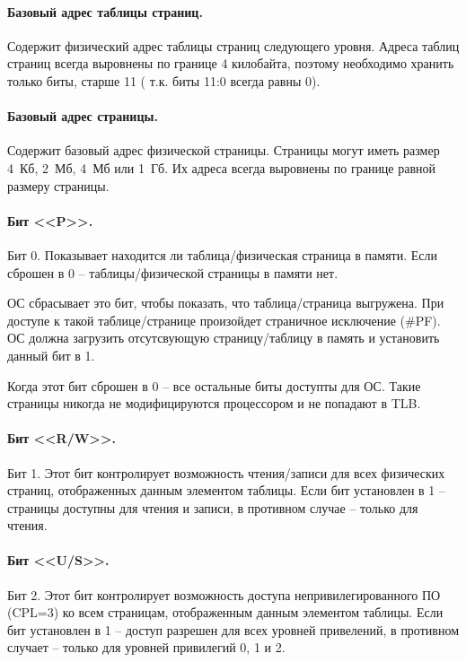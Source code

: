 \paragraph{Базовый адрес таблицы страниц.} Содержит физический адрес таблицы страниц следующего уровня.
Адреса таблиц страниц всегда выровнены по границе 4 килобайта, поэтому необходимо хранить только биты, старше 11 (
т.к. биты 11:0 всегда равны 0).

\paragraph{Базовый адрес страницы.} Содержит базовый адрес физической страницы. Страницы могут иметь размер 4~Кб, 2~Мб,
4~Мб или 1~Гб. Их адреса всегда выровнены по границе равной размеру страницы.

\paragraph{Бит <<P>>.} Бит 0. Показывает находится ли таблица/физическая страница в памяти. Если сброшен в 0 --
таблицы/физической страницы в памяти нет.

ОС сбрасывает это бит, чтобы показать, что таблица/страница выгружена. При доступе к такой таблице/странице произойдет страничное
исключение (\#PF). ОС должна загрузить отсутсвующую страницу/таблицу в память и установить данный бит в 1.

Когда этот бит сброшен в 0 -- все остальные биты доступты для ОС. Такие страницы никогда не модифицируются процессором и
не попадают в TLB.

\paragraph{Бит <<R/W>>.} Бит 1. Этот бит контролирует возможность чтения/записи для всех физических страниц, отображенных
данным элементом таблицы. Если бит установлен в 1 -- страницы доступны для чтения и записи, в противном случае --
только для чтения.

\paragraph{Бит <<U/S>>.} Бит 2. Этот бит контролирует возможность доступа непривилегированного ПО (CPL=3) ко всем страницам,
отображенным данным элементом таблицы. Если бит установлен в 1 -- доступ разрешен для всех уровней привелений,
в противном случает -- только для уровней привилегий 0, 1 и 2.

